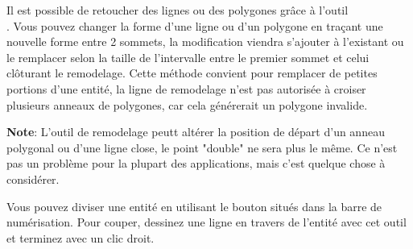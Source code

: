 
Il est possible de retoucher des lignes ou des polygones grâce à l'outil\\ . Vous pouvez changer la forme d'une ligne ou d'un polygone en traçant une nouvelle forme entre 2 sommets, la modification viendra s'ajouter à l'existant ou le remplacer selon la taille de l'intervalle entre le premier sommet et celui clôturant le remodelage. Cette méthode convient pour remplacer de petites portions d'une entité, la ligne de remodelage n'est pas autorisée à croiser plusieurs anneaux de polygones, car cela générerait un polygone invalide.

\textbf{Note}: L'outil de remodelage peutt altérer la position de départ d'un anneau polygonal ou d'une ligne close, le point "double" ne sera plus le même. Ce n'est pas un problème pour la plupart des applications, mais c'est quelque chose à considérer.


Vous pouvez diviser une entité en utilisant le bouton  situés dans la barre de numérisation. Pour couper, dessinez une ligne en travers de l'entité avec cet outil et terminez avec un clic droit.


